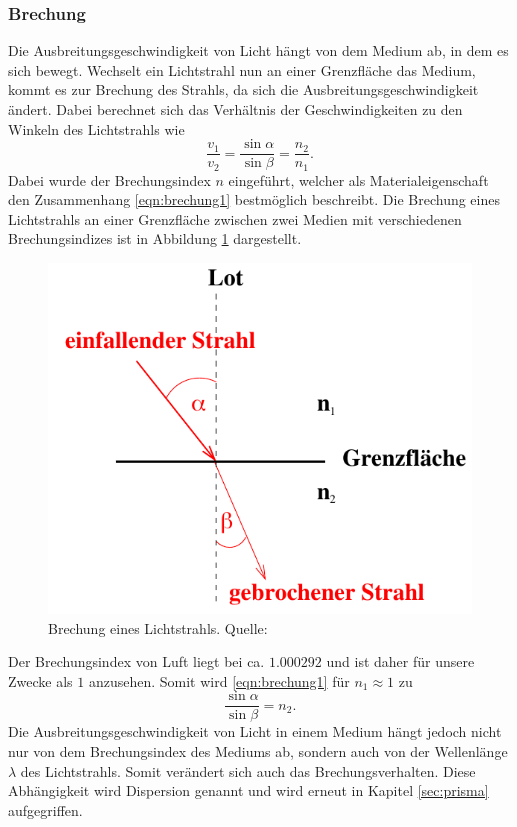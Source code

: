 \subsubsection*{Brechung}
\label{sec:brechung}
Die Ausbreitungsgeschwindigkeit von Licht hängt von dem Medium ab, in dem es sich bewegt. Wechselt ein Lichtstrahl
nun an einer Grenzfläche das Medium, kommt es zur Brechung des Strahls, da sich die Ausbreitungsgeschwindigkeit
ändert. Dabei berechnet sich das Verhältnis der Geschwindigkeiten zu den Winkeln des Lichtstrahls wie
\begin{equation}
    \frac{v_1}{v_2}=\frac{\sin\alpha}{\sin\beta}=\frac{n_2}{n_1}.
    \label{eqn:brechung1}
\end{equation}
Dabei wurde der Brechungsindex $n$ eingeführt, welcher als Materialeigenschaft den Zusammenhang \ref{eqn:brechung1}
bestmöglich beschreibt. Die Brechung eines Lichtstrahls an einer Grenzfläche zwischen zwei Medien mit verschiedenen
Brechungsindizes ist in Abbildung \ref{fig:brechung} dargestellt.
\begin{figure}[H]
    \centering
    \includegraphics[scale = 0.5]{pictures/Brechung.png}
    \caption{Brechung eines Lichtstrahls. Quelle: \cite{AP01}}
    \label{fig:brechung}
\end{figure}
\noindent
Der Brechungsindex von Luft liegt bei ca. $\num{1.000292}$ \cite{AP01} und ist daher für unsere Zwecke als $1$
anzusehen. Somit wird \ref{eqn:brechung1} für $n_1\approx1$ zu
\begin{equation}
    \frac{\sin\alpha}{\sin\beta}=n_2.
    \label{eqn:brechung2}
\end{equation}
Die Ausbreitungsgeschwindigkeit von Licht in einem Medium hängt jedoch nicht nur von dem Brechungsindex des Mediums
ab, sondern auch von der Wellenlänge $\lambda$ des Lichtstrahls. Somit verändert sich auch das Brechungsverhalten.
Diese Abhängigkeit wird Dispersion genannt und wird erneut in Kapitel \ref{sec:prisma} aufgegriffen.

